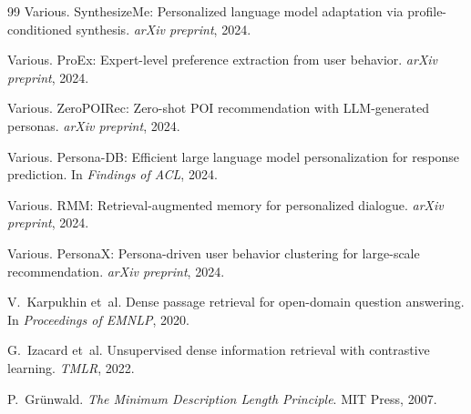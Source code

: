 \documentclass[manuscript,screen,review]{acmart}
\begin{document}
\begin{thebibliography}{99}
Various.
\newblock SynthesizeMe: Personalized language model adaptation via profile-conditioned synthesis.
\newblock \textit{arXiv preprint}, 2024.

Various.
\newblock ProEx: Expert-level preference extraction from user behavior.
\newblock \textit{arXiv preprint}, 2024.

Various.
\newblock ZeroPOIRec: Zero-shot {POI} recommendation with {LLM}-generated personas.
\newblock \textit{arXiv preprint}, 2024.

Various.
\newblock Persona-DB: Efficient large language model personalization for response prediction.
\newblock In \textit{Findings of ACL}, 2024.

Various.
\newblock RMM: Retrieval-augmented memory for personalized dialogue.
\newblock \textit{arXiv preprint}, 2024.

Various.
\newblock PersonaX: Persona-driven user behavior clustering for large-scale recommendation.
\newblock \textit{arXiv preprint}, 2024.

V.~Karpukhin et~al.
\newblock Dense passage retrieval for open-domain question answering.
\newblock In \textit{Proceedings of EMNLP}, 2020.

G.~Izacard et~al.
\newblock Unsupervised dense information retrieval with contrastive learning.
\newblock \textit{TMLR}, 2022.

P.~Gr{\"u}nwald.
\newblock \textit{The Minimum Description Length Principle}.
\newblock MIT Press, 2007.

\end{thebibliography}
\end{document}
